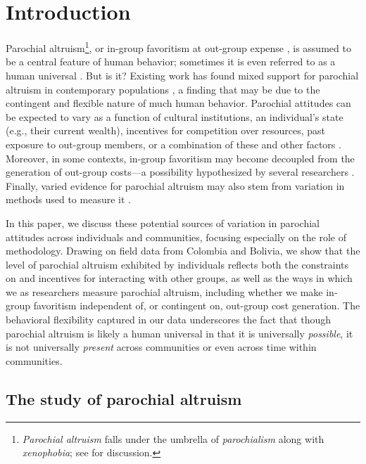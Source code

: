 \documentclass[bibauthoryear]{aa}
\begin{document}

\linenumbers
\section{Introduction}\label{firstbit}
Parochial altruism\footnote{\emph{Parochial altruism} falls under the umbrella of \emph{parochialism} along with \emph{xenophobia}; see \citet{hruschka2013economic} for discussion.}, or in-group favoritism at out-group expense \citep{choi2007coevolution}, is assumed to be a central feature of human behavior; sometimes it is even referred to as a human universal \citep{greene2013moral}. But is it? Existing work has found mixed support for parochial altruism in contemporary populations \citep{Rusch2014}, a finding that may be due to the contingent and flexible nature of much human behavior. Parochial attitudes can be expected to vary as a function of cultural institutions, an individual's state (e.g., their current wealth), incentives for competition over resources,  past exposure to out-group members, or a combination of these and other factors \citep{pisor2019evolution}. Moreover, in some contexts, in-group favoritism may become decoupled from the generation of out-group costs---a possibility hypothesized by several researchers \citep{purzycki2019identity, hruschka2013economic, yamagishi2016parochial, brewer2006evolutionary, schaub2017threat, cashdan2001ethnocentrism}. Finally, varied evidence for parochial altruism may also stem from variation in methods used to measure it \citep{Pisor2020}.


In this paper, we discuss these potential sources of variation in parochial attitudes across individuals and communities, focusing especially on the role of methodology. Drawing on field data from Colombia and Bolivia, we show that the level of  parochial altruism  exhibited by individuals reflects both the constraints on and incentives for interacting with other groups, as well as the ways in which we as researchers measure parochial altruism, including whether we make in-group favoritism independent of, or contingent on, out-group cost generation. The behavioral flexibility captured in our data underscores the fact that though parochial altruism is likely a human universal in that it is universally \textit{possible}, it is not universally \textit{present} across communities or even across time within communities.


\subsection{The study of parochial altruism}\label{onepointone}
\end{document}
